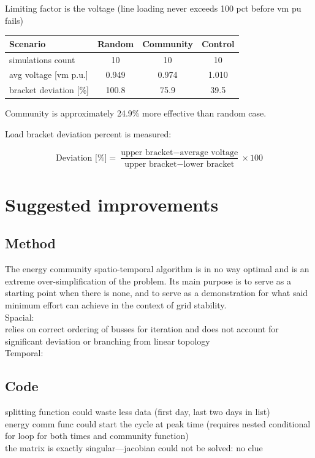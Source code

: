 \documentclass[a4paper,10pt]{report}
\begin{document}
Limiting factor is the voltage (line loading never exceeds 100 pct before vm pu fails)


\begin{table}[htpb]
	\centering
	\begin{tabular}{lccc}
		\toprule
		Scenario & Random & Community & Control \\
		\midrule
		simulations count & 10 & 10 & 10 \\
		avg voltage [vm p.u.] & 0.949 & 0.974 & 1.010 \\
		bracket deviation [\%] & 100.8 & 75.9 & 39.5 \\
		\bottomrule
	\end{tabular}
\label{random_vs_comm}
\end{table}

Community is approximately 24.9\% more effective than random case.

Load bracket deviation percent is measured:

\begin{equation}
	\text{Deviation [\%]} = \frac{\text{upper bracket} - \text{average voltage}}{\text{upper bracket}-\text{lower bracket}}\times 100
\end{equation}


\section{Suggested improvements}
\subsection{Method}
The energy community spatio-temporal algorithm is in no way optimal and is an extreme over-simplification of the problem. Its main purpose is to serve as a starting point when there is none, and to serve as a demonstration for what said minimum effort can achieve in the context of grid stability.\\

Spacial:\\
relies on correct ordering of busses for iteration and does not account for significant deviation or branching from linear topology\\

Temporal:\\



\subsection{Code}
splitting function could waste less data (first day, last two days in list)\\
energy comm func could start the cycle at peak time (requires nested conditional for loop for both times and community function)\\
the matrix is exactly singular---jacobian could not be solved: no clue\\
\end{document}
